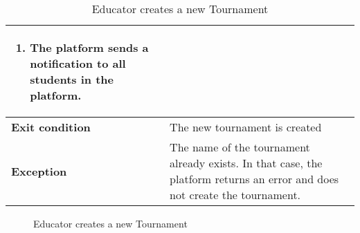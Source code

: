 \begin{enumerate}[label=\textbf{UC\arabic*}:,ref=UC\arabic*,leftmargin=1.3cm]
{\begin{table}[H]
\begin{tabular}{|l|p{11.9cm}|}
\begin{enumerate}[label=\arabic*.]
                              \item The platform sends a notification to all students in the platform.
                        \end{enumerate} \\\hline
                        \textbf{Exit condition}  & The new tournament is created                                                                     \\\hline
                        \textbf{Exception}       & The name of the tournament already exists.
                        In that case, the platform returns an error and does not create the tournament.                                              \\\hline
                  \end{tabular}
                  \caption{Educator creates a new Tournament }
                  \label{table:Educator creates a new Tournament }
            \end{table}
            \begin{figure}[H]
                  \centering
                  \caption{Educator creates a new Tournament }
                  \label{fig:Educator creates a new Tournament }
            \end{figure}
            \pagebreak
      }
\end{enumerate}
